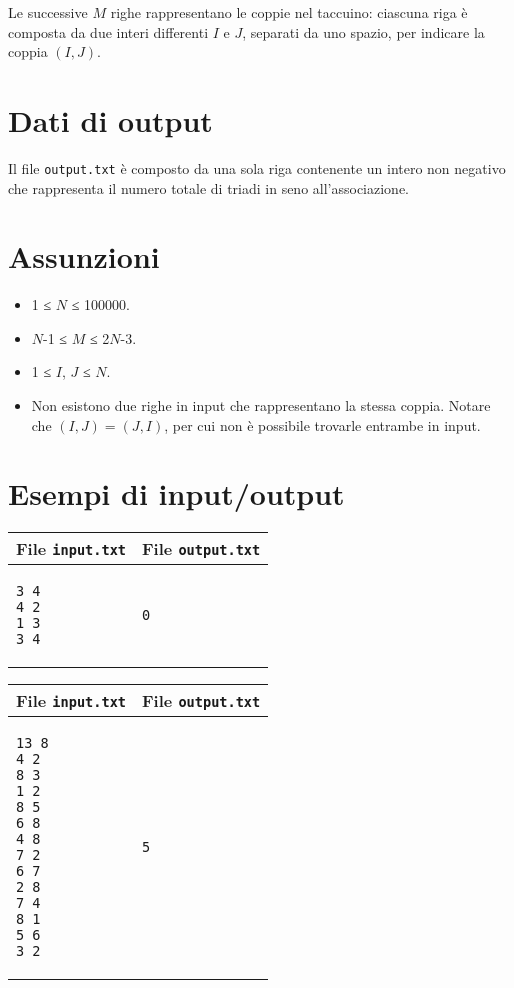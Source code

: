 \documentclass[a4paper,11pt]{article}
\begin{document}
Le successive $M$ righe rappresentano le coppie nel taccuino:
ciascuna riga è composta da due interi differenti $I$
e $J$, separati da uno spazio, per indicare la coppia
$(I,J)$.


\section*{Dati di output}
  
Il file \texttt{output.txt} è composto da una sola riga
contenente un intero non negativo che rappresenta il numero totale di
triadi in seno all'associazione.

  \section*{Assunzioni}
  \begin{itemize}
  
    \item  1 ≤ $N$ ≤ 100000.
    \item  $N$-1 ≤
$M$ ≤ 2$N$-3.
    \item  1 ≤ $I$,
$J$ ≤ $N$.
    \item Non esistono due righe in
input che rappresentano la stessa coppia. Notare che $(I,J) =
(J,I)$, per cui non è possibile trovarle entrambe in
input.
  \end{itemize}

\section*{Esempi di input/output}

  
    \noindent
    \begin{tabular}{p{11cm}|p{5cm}}
    \toprule
    \textbf{File \texttt{input.txt}}
    & \textbf{File \texttt{output.txt}}
    \\
    \midrule
    \scriptsize
    \begin{verbatim}
3 4
4 2
1 3
3 4
\end{verbatim}
    &
    \scriptsize
    \begin{verbatim}
0
\end{verbatim}
    \\
    \bottomrule
    \end{tabular}
  
    \noindent
    \begin{tabular}{p{11cm}|p{5cm}}
    \toprule
    \textbf{File \texttt{input.txt}}
    & \textbf{File \texttt{output.txt}}
    \\
    \midrule
    \scriptsize
    \begin{verbatim}
13 8
4 2
8 3
1 2
8 5 
6 8
4 8
7 2
6 7
2 8
7 4
8 1
5 6
3 2
\end{verbatim}
    &
    \scriptsize
    \begin{verbatim}
5
\end{verbatim}
    \\
    \bottomrule
    \end{tabular}
  
\end{document}
